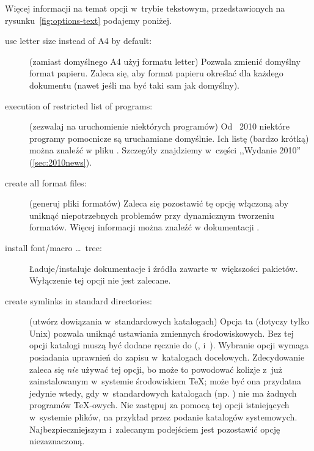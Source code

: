 \documentclass{article}
\begin{document}
Więcej informacji na temat opcji w~trybie tekstowym, przedstawionych na
rysunku~\ref{fig:options-text} podajemy poniżej.
\begin{description}
\item[use letter size instead of A4 by default:] (zamiast domyślnego A4 użyj  formatu
 letter) Pozwala zmienić domyślny format papieru. Zaleca się, aby format papieru
 określać  dla każdego dokumentu (nawet jeśli ma być taki sam jak domyślny).

\item[execution of restricted list of programs:] (zezwalaj na uruchomienie
 niektórych programów) Od \TL\ 2010 niektóre programy pomocnicze są uruchamiane domyślnie.
 Ich listę (bardzo krótką) można znaleźć w pliku  .
 Szczegóły znajdziemy w~części ,,Wydanie 2010'' (\ref{sec:2010news}).
\item[create all format files:] (generuj pliki formatów)
 Zaleca się pozostawić tę opcję włączoną 
  aby uniknąć niepotrzebnych problemów przy dynamicznym tworzeniu formatów. Więcej informacji można znaleźć w dokumentacji  .
  

\item[install font/macro \ldots\ tree:]  Ładuje/instaluje dokumentacje i źródła
 zawarte w~większości pakietów.  Wyłączenie tej opcji nie jest zalecane.

\item[create symlinks in standard directories:] (utwórz dowiązania
 w~standardowych katalogach) Opcja ta (dotyczy tylko Unix)  pozwala
 uniknąć ustawiania zmiennych środowiskowych. Bez tej opcji katalogi \TL{}
 muszą być dodane  ręcznie do (,  i~).
 Wybranie opcji wymaga posiadania uprawnień do zapisu w~katalogach docelowych.
 Zdecydowanie zaleca się  \emph{nie} używać tej opcji, bo może to powodować
 kolizje z~już zainstalowanym w~systemie środowiskiem \TeX; może być
 ona przydatna jedynie wtedy, gdy w~standardowych katalogach
 (np. ) nie ma żadnych programów
 \TeX-owych. Nie zastępuj za pomocą tej opcji istniejących w~systemie
 plików, na przykład przez podanie katalogów
 systemowych. Najbezpieczniejszym i~zalecanym podejściem jest
 pozostawić opcję niezaznaczoną.


\end{description}
\end{document}
